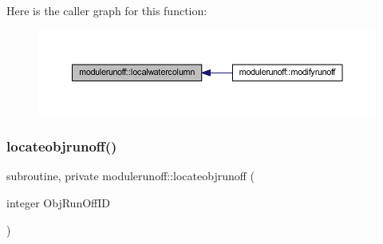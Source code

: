 Here is the caller graph for this function\+:\nopagebreak
\begin{figure}[H]
\begin{center}
\leavevmode
\includegraphics[width=350pt]{namespacemodulerunoff_abd7df3c244fbd0c4171c796df0f50906_icgraph}
\end{center}
\end{figure}
\mbox{\label{namespacemodulerunoff_a573ec5acc76c43856a82166862259a60}} 
\subsubsection{\texorpdfstring{locateobjrunoff()}{locateobjrunoff()}}
{\footnotesize\ttfamily subroutine, private modulerunoff\+::locateobjrunoff (\begin{DoxyParamCaption}\item[{integer}]{Obj\+Run\+Off\+ID }\end{DoxyParamCaption})\hspace{0.3cm}{\ttfamily [private]}}


